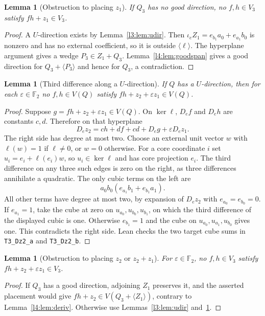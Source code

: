 \documentclass[11pt,a4paper]{article}
\theoremstyle{plain}
\newtheorem{lemma}[theorem]{Lemma}
\theoremstyle{remark}
\theoremstyle{plain}
\newcommand{\F}{\mathbb F_2}
\begin{document}
\begin{lemma}[Obstruction to placing $z_1$]\label{l3:lem:A}
If $Q_3$ has no good direction, no $f,h\in V_3$ satisfy $fh+z_1\in V_3$.
\end{lemma}
\begin{proof}
A $U$-direction exists by Lemma~\ref{l3:lem:udir}. Then $\iota_e Z_1=e_{b_1}a_0+e_{a_1}b_0$ is nonzero and has no external coefficient, so it is outside $\langle\ell\rangle$. The hyperplane argument gives a wedge $P_3\in Z_1+Q_3$. Lemma~\ref{l4:lem:goodspan} gives a good direction for $Q_3+\langle P_3\rangle$ and hence for $Q_3$, a contradiction.
\end{proof}

\begin{lemma}[Third difference along a $U$-direction]\label{l3:lem:third}
If $Q$ has a $U$-direction, then for each $\varepsilon\in\F$ no $f,h\in V(Q)$ satisfy $fh+z_2+\varepsilon z_1\in V(Q)$.
\end{lemma}
\begin{proof}
Suppose $g=fh+z_2+\varepsilon z_1\in V(Q)$. On $\ker\ell$, $D_ef$ and $D_eh$ are constants $c,d$. Therefore on that hyperplane
\[
D_ez_2=ch+df+cd+D_eg+\varepsilon D_ez_1.
\]
The right side has degree at most two. Choose an external unit vector $w$ with $\ell(w)=1$ if $\ell\ne0$, or $w=0$ otherwise. For a core coordinate $i$ set $u_i=e_i+\ell(e_i)w$, so $u_i\in\ker\ell$ and has core projection $e_i$. The third difference on any three such edges is zero on the right, as three differences annihilate a quadratic. The only cubic terms on the left are
\[
a_0b_0(e_{a_1}b_1+e_{b_1}a_1).
\]
All other terms have degree at most two, by expansion of $D_ez_2$ with $e_{a_0}=e_{b_0}=0$. If $e_{a_1}=1$, take the cube at zero on $u_{a_0},u_{b_0},u_{b_1}$, on which the third difference of the displayed cubic is one. Otherwise $e_{b_1}=1$ and the cube on $u_{a_0},u_{a_1},u_{b_0}$ gives one. This contradicts the right side. Lean checks the two target cube sums in \nolinkurl{T3_Dz2_a} and \nolinkurl{T3_Dz2_b}.
\end{proof}

\begin{lemma}[Obstruction to placing $z_2$ or $z_2+z_1$]\label{l3:lem:C}
For $\varepsilon\in\F$, no $f,h\in V_3$ satisfy $fh+z_2+\varepsilon z_1\in V_3$.
\end{lemma}
\begin{proof}
If $Q_3$ has a good direction, adjoining $Z_1$ preserves it, and the asserted placement would give $fh+z_2\in V(Q_3+\langle Z_1\rangle)$, contrary to Lemma~\ref{l4:lem:deriv}. Otherwise use Lemmas~\ref{l3:lem:udir} and~\ref{l3:lem:third}.
\end{proof}
\end{document}
